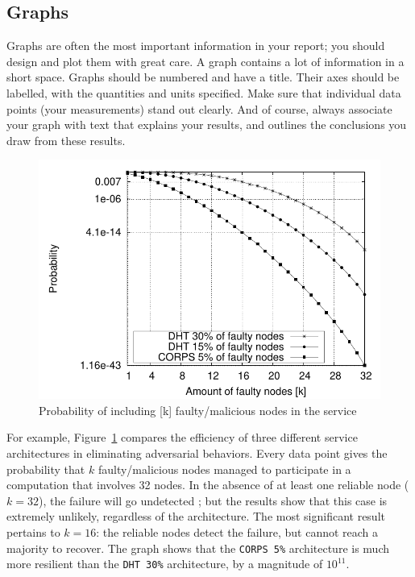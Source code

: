 \documentclass{scrartcl}
\begin{document}
\subsection{Graphs}

Graphs are often the most important information in your report; you should design and plot them with great care. A graph contains a lot of information in a short space. Graphs should be numbered and have a title. Their axes should be labelled, with the quantities and units specified. Make sure that individual data points (your measurements) stand out clearly. And of course, always associate your graph with text that explains your results, and outlines the conclusions you draw from these results.

\begin{figure}
	\begin{center}
		\includegraphics[scale=0.9]{perf-plot-1.pdf}
	\end{center}
	\caption{Probability of including [k] faulty/malicious nodes in the service}
	\label{graph:faulty-proportion-plot}
\end{figure}

For example, Figure~\ref{graph:faulty-proportion-plot} compares the efficiency of three different service architectures in eliminating adversarial behaviors. Every data point gives the probability that $k$ faulty/malicious nodes managed to participate in a computation that involves 32 nodes. In the absence of at least one reliable node ($k = 32$), the failure will go undetected ; but the results show that this case is extremely unlikely, regardless of the architecture. The most significant result pertains to $k = 16$: the reliable nodes detect the failure, but cannot reach a majority to recover. The graph shows that the \texttt{CORPS 5\%} architecture is much more resilient than the \texttt{DHT 30\%} architecture, by a magnitude of $10^{11}$.
\end{document}
